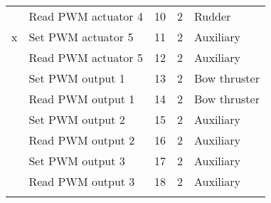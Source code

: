 \begin{table}[h]
\begin{tabular}{llrrl}
	& Read PWM actuator 4 & 10 & 2 & Rudder\\ 
	x& Set PWM actuator 5 & 11 & 2 & Auxiliary\\
	& Read PWM actuator 5 & 12 & 2 & Auxiliary\\ 
	& Set PWM output 1 & 13 & 2 & Bow thruster\\
	& Read PWM output 1 & 14 & 2 & Bow thruster\\ 
	& Set PWM output 2 & 15 & 2 & Auxiliary\\
	& Read PWM output 2 & 16 & 2 & Auxiliary\\ 
	& Set PWM output 3 & 17 & 2 & Auxiliary\\
	& Read PWM output 3 & 18 & 2 & Auxiliary\\ 
	\midrule
	\label{tab:commands}
	\end{tabular}
\end{table}
\newpage

